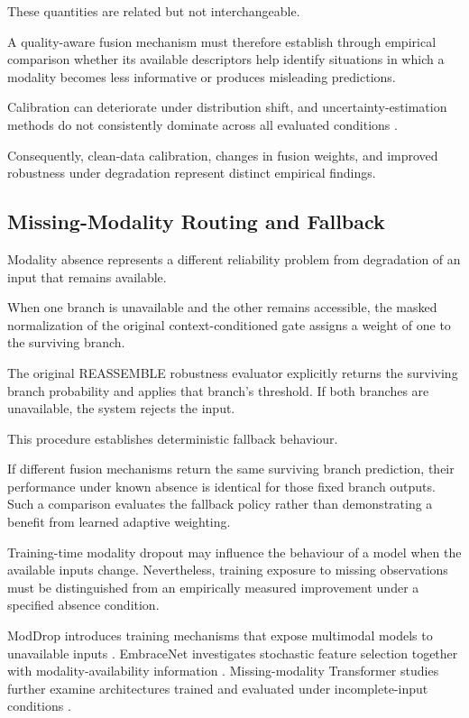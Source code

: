 These quantities are related but not interchangeable.

A quality-aware fusion mechanism must therefore establish through empirical comparison whether its available descriptors help identify situations in which a modality becomes less informative or produces misleading predictions.

Calibration can deteriorate under distribution shift, and uncertainty-estimation methods do not consistently dominate across all evaluated conditions \parencite{P008}.

Consequently, clean-data calibration, changes in fusion weights, and improved robustness under degradation represent distinct empirical findings.

\subsection{Missing-Modality Routing and Fallback}

Modality absence represents a different reliability problem from degradation of an input that remains available.

When one branch is unavailable and the other remains accessible, the masked normalization of the original context-conditioned gate assigns a weight of one to the surviving branch.

The original REASSEMBLE robustness evaluator explicitly returns the surviving branch probability and applies that branch’s threshold. If both branches are unavailable, the system rejects the input.

This procedure establishes deterministic fallback behaviour.

If different fusion mechanisms return the same surviving branch prediction, their performance under known absence is identical for those fixed branch outputs. Such a comparison evaluates the fallback policy rather than demonstrating a benefit from learned adaptive weighting.

Training-time modality dropout may influence the behaviour of a model when the available inputs change. Nevertheless, training exposure to missing observations must be distinguished from an empirically measured improvement under a specified absence condition.

ModDrop introduces training mechanisms that expose multimodal models to unavailable inputs \parencite{P005}. EmbraceNet investigates stochastic feature selection together with modality-availability information \parencite{P007}. Missing-modality Transformer studies further examine architectures trained and evaluated under incomplete-input conditions \parencite{P016}.

